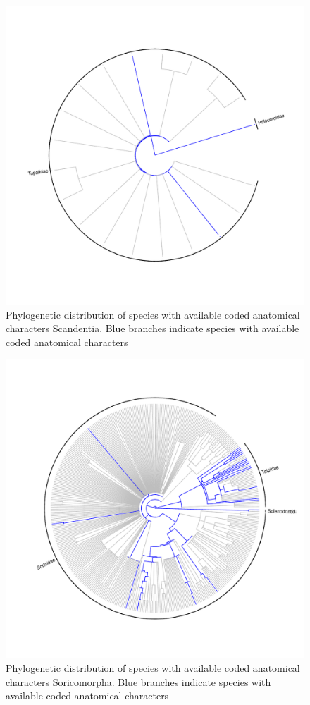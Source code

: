 \documentclass[12pt,letterpaper]{article}
\begin{document}
\begin{figure}[!htbp]
\centering
    \includegraphics[width=1\textwidth]{Supp_figure_SCANDENTIA.pdf}
\caption{Phylogenetic distribution of species with available coded anatomical characters Scandentia. Blue branches indicate species with available coded anatomical characters}
\label{Supp_Figure_Phylo-Scandentia}
\end{figure}

\begin{figure}[!htbp]
\centering
    \includegraphics[width=1\textwidth]{Supp_figure_SORICOMORPHA.pdf}
\caption{Phylogenetic distribution of species with available coded anatomical characters Soricomorpha. Blue branches indicate species with available coded anatomical characters}
\label{Supp_Figure_Phylo-Soricomorpha}
\end{figure}
\end{document}
